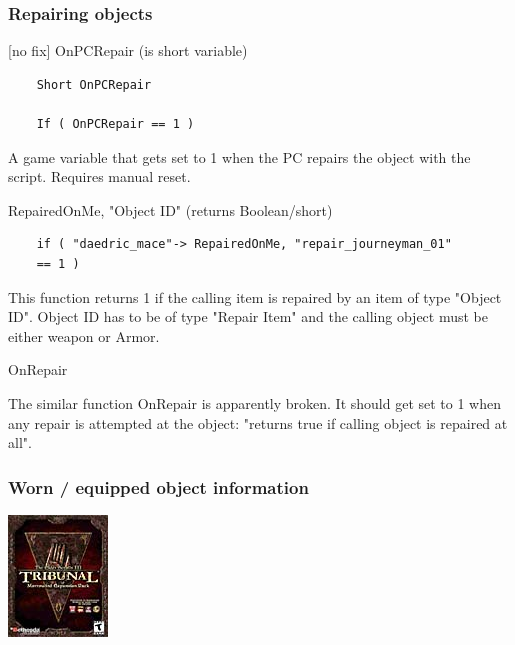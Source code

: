 
\hypertarget{repairing-objects}{%
\subsubsection{Repairing objects}\label{repairing-objects}}

	{[}no fix{]} OnPCRepair (is short variable)

\begin{lstlisting}	
	Short OnPCRepair
	
	If ( OnPCRepair == 1 )
\end{lstlisting}

A game variable that gets set to 1 when the PC repairs the object with
the script. Requires manual reset.

	RepairedOnMe, "Object ID" (returns Boolean/short)

\begin{lstlisting}	
	if ( "daedric_mace"-> RepairedOnMe, "repair_journeyman_01"
	== 1 )
\end{lstlisting}

This function returns 1 if the calling item is repaired by an item of
type "Object ID". Object ID has to be of type "Repair Item" and the
calling object must be either weapon or Armor.

OnRepair

The similar function OnRepair is apparently broken. It should get set to
1 when any repair is attempted at the object: "returns true if calling
object is repaired at all".

\hypertarget{worn-equipped-object-information}{%
\subsubsection{Worn / equipped object
information}\label{worn-equipped-object-information}}

\includegraphics{media/image6.png}

